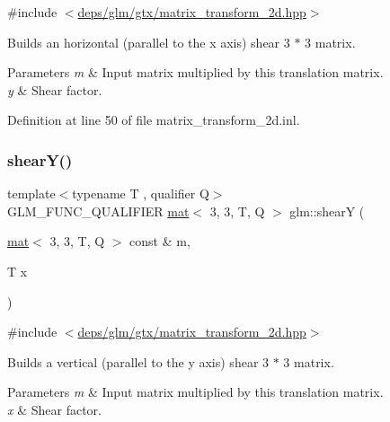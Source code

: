 {\ttfamily \#include $<$\hyperlink{matrix__transform__2d_8hpp}{deps/glm/gtx/matrix\+\_\+transform\+\_\+2d.\+hpp}$>$}

Builds an horizontal (parallel to the x axis) shear 3 $\ast$ 3 matrix.


\begin{DoxyParams}{Parameters}
{\em m} & Input matrix multiplied by this translation matrix. \\
\hline
{\em y} & Shear factor. \\
\hline
\end{DoxyParams}


Definition at line 50 of file matrix\+\_\+transform\+\_\+2d.\+inl.

\mbox{\label{group__gtx__matrix__transform__2d_ga2587e46b06a9801aba9ded45cc73445b}} 
\subsubsection{\texorpdfstring{shear\+Y()}{shearY()}}
{\footnotesize\ttfamily template$<$typename T , qualifier Q$>$ \\
G\+L\+M\+\_\+\+F\+U\+N\+C\+\_\+\+Q\+U\+A\+L\+I\+F\+I\+ER \hyperlink{structglm_1_1mat}{mat}$<$ 3, 3, T, Q $>$ glm\+::shearY (\begin{DoxyParamCaption}\item[{\hyperlink{structglm_1_1mat}{mat}$<$ 3, 3, T, Q $>$ const \&}]{m,  }\item[{T}]{x }\end{DoxyParamCaption})}



{\ttfamily \#include $<$\hyperlink{matrix__transform__2d_8hpp}{deps/glm/gtx/matrix\+\_\+transform\+\_\+2d.\+hpp}$>$}

Builds a vertical (parallel to the y axis) shear 3 $\ast$ 3 matrix.


\begin{DoxyParams}{Parameters}
{\em m} & Input matrix multiplied by this translation matrix. \\
\hline
{\em x} & Shear factor. \\
\hline
\end{DoxyParams}



